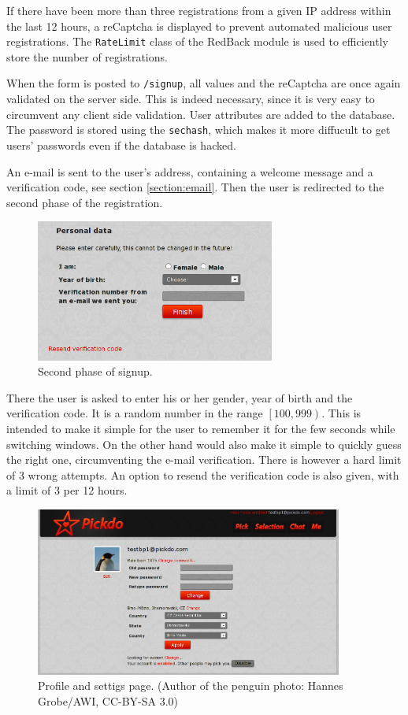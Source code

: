 \documentclass[12pt,oneside]{fithesis}
\begin{document}
		If there have been more than three registrations from a given IP address within the last 12 hours, a reCaptcha is displayed to prevent automated malicious user registrations. The \texttt{RateLimit} class of the RedBack module is used to efficiently store the number of registrations.
		
		When the form is posted to \texttt{/signup}, all values and the reCaptcha are once again validated on the server side. This is indeed necessary, since it is very easy to circumvent any client side validation. User attributes are added to the database. The password is stored using the \texttt{sechash}, which makes it more diffucult to get users' passwords even if the database is hacked.
		
		An e-mail is sent to the user's address, containing a welcome message and a verification code, see section \ref{section:email}. Then the user is redirected to the second phase of the registration.
		
		\begin{figure}[h]
	  \centering
	    \includegraphics[width=0.7\textwidth]{screen-signup1.png}
		  \caption{Second phase of signup.}
		  \label{fig:screen-signup1}
	  \end{figure}
	  There the user is asked to enter his or her gender, year of birth and the verification code. It is a random number in the range $\left[ 100,999\right)$. This is intended to make it simple for the user to remember it for the few seconds while switching windows. On the other hand would also make it simple to quickly guess the right one, circumventing the e-mail verification. There is however a hard limit of 3 wrong attempts. An option to resend the verification code is also given, with a limit of 3 per 12 hours.
	  
		\begin{figure}[h]
	  \centering
	    \includegraphics[width=0.9\textwidth]{screen-profile.png}
		  \caption{Profile and settigs page. (Author of the penguin photo: Hannes Grobe/AWI, CC-BY-SA 3.0)}
		  \label{fig:screen-profile}
	  \end{figure}	  
	  
\end{document}
